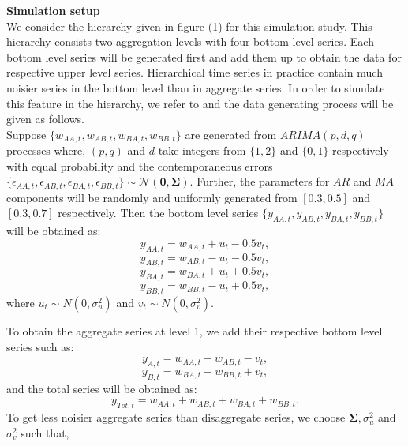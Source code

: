 \documentclass[a4paper, 11pt]{article}
\begin{document}
\noindent
\textbf{Simulation setup}\\

\noindent
We consider the hierarchy given in figure (1) for this simulation study. This hierarchy consists two aggregation levels with four bottom level series. Each bottom level series will be generated first and add them up to obtain the data for respective upper level series. Hierarchical time series in practice contain much noisier series in the bottom level than in aggregate series. In order to simulate this feature in the hierarchy, we refer to \citet{Wickramasuriya2017} and the data generating process will be given as follows. \\

\noindent
Suppose $\{w_{AA,t},w_{AB,t},w_{BA,t},w_{BB,t}\}$ are generated from $ARIMA(p,d,q)$ processes where, $(p,q)$ and $d$ take integers from $\{1,2\}$ and $\{0,1\}$ respectively with equal probability and the contemporaneous errors $\{\epsilon_{AA,t},\epsilon_{AB,t},\epsilon_{BA,t},\epsilon_{BB,t}\} \sim \mathcal{N}(\bm{0}, \bm{\Sigma})$. Further, the parameters for $AR$ and $MA$ components will be randomly and uniformly generated from $[0.3,0.5]$ and $[0.3,0.7]$ respectively. Then the bottom level series $\{y_{AA,t},y_{AB,t},y_{BA,t},y_{BB,t}\}$ will be obtained as: 
$$y_{AA,t} = w_{AA,t} + u_t - 0.5v_t,$$
$$y_{AB,t} = w_{AB,t} - u_t - 0.5v_t,$$
$$y_{BA,t} = w_{BA,t} + u_t + 0.5v_t,$$
$$y_{BB,t} = w_{BB,t} - u_t + 0.5v_t,$$ 
\noindent
where $u_t \sim N(0,\sigma^2_u)$ and $v_t \sim N(0,\sigma^2_v)$. 

\noindent
To obtain the aggregate series at level 1, we add their respective bottom level series such as: 
$$y_{A,t} = w_{AA,t} + w_{AB,t} - v_t,$$
$$y_{B,t} = w_{BA,t} + w_{BB,t} + v_t,$$
\noindent
and the total series will be obtained as: 
$$y_{Tot,t} = w_{AA,t} + w_{AB,t} + w_{BA,t} + w_{BB,t}.$$
\noindent
To get less noisier aggregate series than disaggregate series, we choose $\bm{\Sigma}, \sigma^2_u$ and $\sigma^2_v$ such that, 
\end{document}
